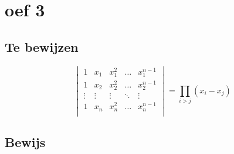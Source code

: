 \documentclass[lineaire_algebra_oplossingen.tex]{subfiles}
\begin{document}
\section{oef 3}
\subsection*{Te bewijzen}
\[
\begin{vmatrix}
1 & x_1 & x_1^2 & \hdots & x_1^{n-1}\\
1 & x_2 & x_2^2 & \hdots & x_2^{n-1}\\
\vdots &\vdots &\vdots & \ddots & \vdots \\
1 & x_n & x_n^2 & \hdots & x_n^{n-1}\\
\end{vmatrix}
=
\prod_{i>j}(x_i-x_j)
\]
\subsection*{Bewijs}
\end{document}
